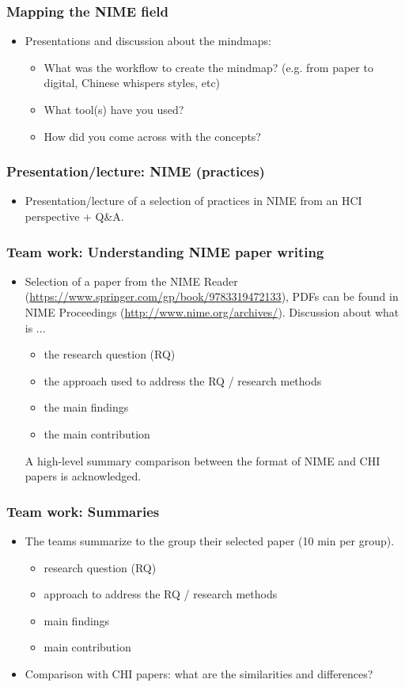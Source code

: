 \documentclass[screen, aspectratio=43]{beamer}
\begin{document}
%
\begin{frame}
\frametitle{Mapping the NIME field}
\begin{itemize}
\item Presentations and discussion about the mindmaps:
\begin{itemize}
\item What was the workflow to create the mindmap? (e.g. from paper to digital, Chinese whispers styles, etc)
\item What tool(s) have you used?
\item How did you come across with the concepts?
\end{itemize}
\end{itemize}
\end{frame}
%
\begin{frame}
\frametitle{Presentation/lecture: NIME (practices)}
\begin{itemize}
\item Presentation/lecture of a selection of practices in NIME from an HCI perspective + Q\&A.
\end{itemize}
\end{frame}
%
\begin{frame}
\frametitle{Team work: Understanding NIME paper writing}
\begin{itemize}
\item Selection of a paper from the NIME Reader (\url{https://www.springer.com/gp/book/9783319472133}), PDFs can be found in NIME Proceedings (\url{http://www.nime.org/archives/}).
Discussion about what is ... 
\begin{itemize}
\item the research question (RQ)
\item the approach used to address the RQ / research methods
\item the main findings 
\item the main contribution
\end{itemize}
A high-level summary comparison between the format of NIME and CHI papers is acknowledged.
\end{itemize}
\end{frame}
%
\begin{frame}
\frametitle{Team work: Summaries}
\begin{itemize}
\item The teams summarize to the group their selected paper (10 min per group). 
\begin{itemize}
\item research question (RQ)
\item approach to address the RQ / research methods
\item main findings 
\item main contribution
\end{itemize}
\item Comparison with CHI papers: what are the similarities and differences? 
\end{itemize}
\end{frame}
\end{document}
